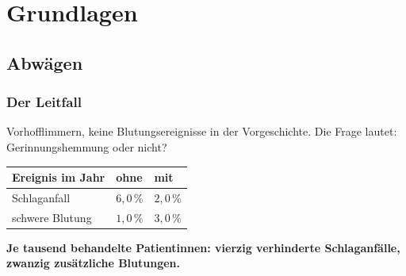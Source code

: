 \part{Grundlagen}

\chapter{Abwägen}

\section{Der Leitfall}

\begin{merksatz}
Vorhofflimmern, keine Blutungsereignisse in der Vorgeschichte. Die Frage lautet: Gerinnungshemmung oder nicht?

\begin{center}
{\small
\renewcommand{\arraystretch}{1.5}
\begin{tabular}{@{}P{3.0cm}P{2.4cm}P{2.4cm}@{}}
\toprule
\textbf{Ereignis im Jahr} & \textbf{ohne} & \textbf{mit}\\
\midrule
Schlaganfall & $6{,}0\,\%$ & $2{,}0\,\%$\\
schwere Blutung & $1{,}0\,\%$ & $3{,}0\,\%$\\
\bottomrule
\end{tabular}}
\end{center}

\begin{center}
\begin{minipage}{0.9\textwidth}
\textbf{Je tausend behandelte Patientinnen: vierzig verhinderte Schlaganfälle, zwanzig zusätzliche Blutungen.}
\end{minipage}
\end{center}

\begin{center}
\begin{minipage}{0.88\textwidth}
\end{minipage}
\end{center}
\end{merksatz}


